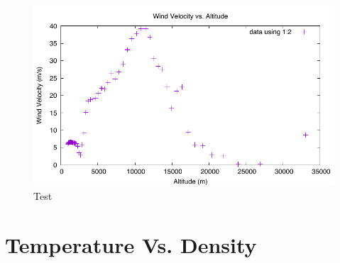 \documentclass{article}
\begin{document}
\begin{figure}
\centering
\includegraphics{josh-data/figure1.pdf}
\caption{Test}
\label{josh1}

\end{figure}


\part{Temperature Vs. Density}
\end{document}
